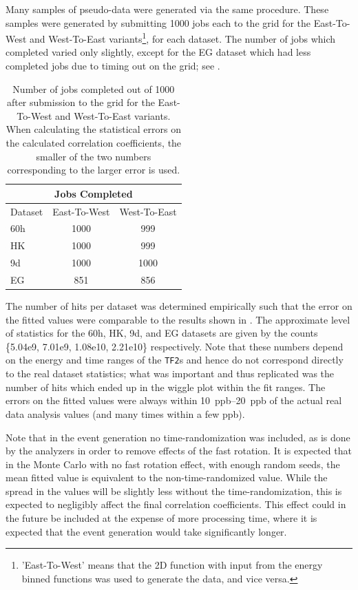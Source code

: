 Many samples of pseudo-data were generated via the same procedure. These samples were generated by submitting 1000 jobs each to the grid for the East-To-West and West-To-East variants\footnote{'East-To-West' means that the 2D function with input from the \RE energy binned functions was used to generate the data, and vice versa.}, for each dataset. The number of jobs which completed varied only slightly, except for the EG dataset which had less completed jobs due to timing out on the grid; see . 


\begin{table}[h]
\centering
\renewcommand{\arraystretch}{1.2}
\begin{tabularx}{0.4\linewidth}{@{\extracolsep{\fill}}lcc}
  \hline
    \multicolumn{3}{c}{\textbf{Jobs Completed}} \\
  \hline
    Dataset & East-To-West & West-To-East \\
  \hline
    60h & 1000 & 999 \\
    HK & 1000 & 999 \\
    9d & 1000 & 1000 \\
    EG & 851 & 856 \\ 
  \hline
\end{tabularx}
\caption[]{Number of jobs completed out of 1000 after submission to the grid for the East-To-West and West-To-East variants. When calculating the statistical errors on the calculated correlation coefficients, the smaller of the two numbers corresponding to the larger error is used.}
\label{tab:jobs}
\end{table}


The number of hits per dataset was determined empirically such that the error on the fitted \R values were comparable to the \Rone results shown in . The approximate level of statistics for the 60h, HK, 9d, and EG datasets are given by the counts \{5.04e9, 7.01e9, 1.08e10, 2.21e10\} respectively. Note that these numbers depend on the energy and time ranges of the \texttt{TF2}s and hence do not correspond directly to the real dataset statistics; what was important and thus replicated was the number of hits which ended up in the wiggle plot within the fit ranges. The errors on the fitted \R values were always within \SIrange{10}{20}{ppb} of the actual real data analysis values (and many times within a few ppb).

Note that in the event generation no time-randomization was included, as is done by the analyzers in order to remove effects of the fast rotation. It is expected that in the Monte Carlo with no fast rotation effect, with enough random seeds, the mean fitted \R value is equivalent to the non-time-randomized \R value. While the spread in the \R values will be slightly less without the time-randomization, this is expected to negligibly affect the final correlation coefficients. This effect could in the future be included at the expense of more processing time, where it is expected that the event generation would take significantly longer.

